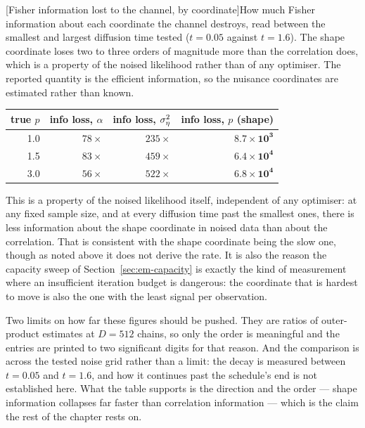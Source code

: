 \begin{center}
\begin{minipage}{\linewidth}\centering
{}[Fisher information lost to the channel, by coordinate]{How much Fisher information about each coordinate the channel destroys, read between the smallest and largest diffusion time tested ($t = 0.05$ against $t = 1.6$). The shape coordinate loses two to three orders of magnitude more than the correlation does, which is a property of the noised likelihood rather than of any optimiser. The reported quantity is the efficient information, so the nuisance coordinates are estimated rather than known.}
\label{tab:em-information}
\begin{tabular}{@{}rrrr@{}}
\toprule
true $p$ & info loss, $\alpha$ & info loss, $\sigma_\eta^2$ & info loss, $p$ (shape) \\
\midrule
1.0 & $78\times$ & $235\times$ & $\mathbf{8.7\times10^{3}}$ \\
1.5 & $83\times$ & $459\times$ & $\mathbf{6.4\times10^{4}}$ \\
3.0 & $56\times$ & $522\times$ & $\mathbf{6.8\times10^{4}}$ \\
\bottomrule
\end{tabular}
\end{minipage}
\end{center}
\noindent This is a property of the noised likelihood itself, independent of
any optimiser: at any fixed sample size, and at every diffusion time past the
smallest ones, there is less information about the shape coordinate in noised
data than about the correlation. That is consistent with the shape coordinate
being the slow one, though as noted above it does not derive the rate. It is also the reason
the capacity sweep of Section~\ref{sec:em-capacity} is exactly the kind of
measurement where an insufficient iteration budget is dangerous: the
coordinate that is hardest to move is also the one with the least signal per
observation.

Two limits on how far these figures should be pushed. They are ratios of
outer-product estimates at $D=512$ chains, so only the order is meaningful
and the entries are printed to two significant digits for that reason. And the
comparison is across the tested noise grid rather than a limit: the decay
is measured between $t=0.05$ and $t=1.6$, and how it continues past the
schedule's end is not established here. What the table supports is the
direction and the order --- shape information collapses far faster than
correlation information --- which is the claim the rest of the chapter
rests on.

